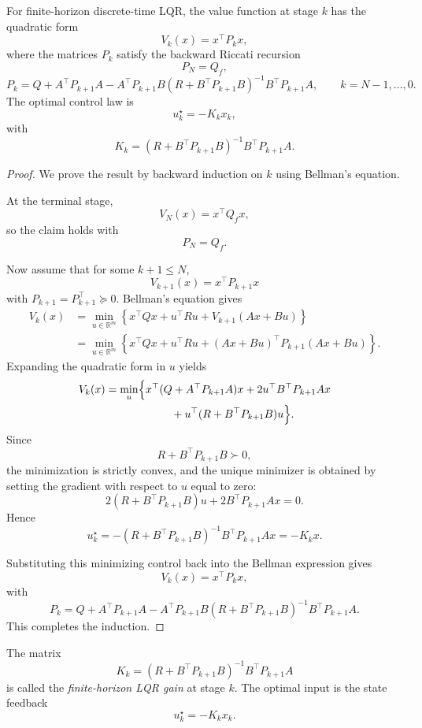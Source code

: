 \begin{theorem}\label{thm:l6-quadratic-value-function-and-linear-optimal-control}
	For finite-horizon discrete-time LQR, the value function at stage $k$ has the quadratic form
	\[
		V_k(x)=x^\top P_k x,
	\]
	where the matrices $P_k$ satisfy the backward Riccati recursion
	\[
		P_N=Q_f,
	\]
	\[
		P_k = Q + A^\top P_{k+1}A - A^\top P_{k+1}B\left(R+B^\top P_{k+1}B\right)^{-1}B^\top P_{k+1}A,
	\qquad
		k=N-1,\dots,0.
	\]
	The optimal control law is
	\[
		u_k^\star = -K_k x_k,
	\]
	with
	\[
		K_k = \left(R+B^\top P_{k+1}B\right)^{-1}B^\top P_{k+1}A.
	\]
\end{theorem}
\begin{proof}
	We prove the result by backward induction on $k$ using Bellman's equation.

	At the terminal stage,
	\[
		V_N(x)=x^\top Q_f x,
	\]
	so the claim holds with
	\[
		P_N=Q_f.
	\]

	Now assume that for some $k+1 \le N$,
	\[
		V_{k+1}(x)=x^\top P_{k+1}x
	\]
	with $P_{k+1}=P_{k+1}^\top \succeq 0$. Bellman's equation gives
	\begin{align*}
		V_k(x)
		&= \min_{u \in \mathbb{R}^m}
		\left\{
		x^\top Qx + u^\top Ru + V_{k+1}(Ax+Bu)
		\right\} \\
		&= \min_{u \in \mathbb{R}^m}
		\left\{
		x^\top Qx + u^\top Ru + (Ax+Bu)^\top P_{k+1}(Ax+Bu)
		\right\}.
	\end{align*}
	Expanding the quadratic form in $u$ yields
	\begin{align*}
		V_k(x)
		&= \min_{u}
		\Bigl\{
		x^\top(Q+A^\top P_{k+1}A)x
		+ 2u^\top B^\top P_{k+1}Ax \\
		&\qquad\qquad\qquad
		+ u^\top(R+B^\top P_{k+1}B)u
		\Bigr\}.
	\end{align*}
	Since
	\[
		R+B^\top P_{k+1}B \succ 0,
	\]
	the minimization is strictly convex, and the unique minimizer is obtained by setting the gradient with respect to $u$ equal to zero:
	\[
		2(R+B^\top P_{k+1}B)u + 2B^\top P_{k+1}Ax = 0.
	\]
	Hence
	\[
		u_k^\star = -\left(R+B^\top P_{k+1}B\right)^{-1}B^\top P_{k+1}Ax = -K_k x.
	\]

	Substituting this minimizing control back into the Bellman expression gives
	\[
		V_k(x)=x^\top P_k x,
	\]
	with
	\[
		P_k = Q + A^\top P_{k+1}A - A^\top P_{k+1}B\left(R+B^\top P_{k+1}B\right)^{-1}B^\top P_{k+1}A.
	\]
	This completes the induction.
\end{proof}

\begin{definition}\label{def:l6-riccati-gain-matrix}
	The matrix
	\[
		K_k = \left(R+B^\top P_{k+1}B\right)^{-1}B^\top P_{k+1}A
	\]
	is called the \emph{finite-horizon LQR gain} at stage $k$. The optimal input is the state feedback
	\[
		u_k^\star = -K_k x_k.
	\]
\end{definition}

